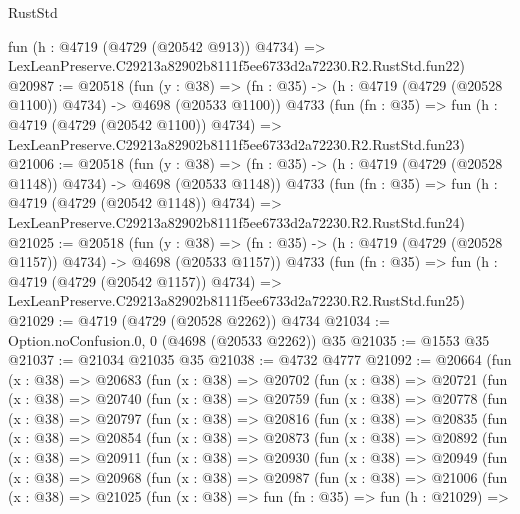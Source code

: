 \begin{lexlean}{RustStd}
\begin{coremodule}
    fun (h : @4719 (@4729 (@20542 @913)) @4734) =>
    LexLeanPreserve.C29213a82902b8111f5ee6733d2a72230.R2.RustStd.fun22)
@20987 := @20518
    (fun (y : @38) =>
    (fn : @35) -> (h : @4719 (@4729 (@20528 @1100)) @4734) -> @4698 (@20533 @1100))
    @4733
    (fun (fn : @35) =>
    fun (h : @4719 (@4729 (@20542 @1100)) @4734) =>
    LexLeanPreserve.C29213a82902b8111f5ee6733d2a72230.R2.RustStd.fun23)
@21006 := @20518
    (fun (y : @38) =>
    (fn : @35) -> (h : @4719 (@4729 (@20528 @1148)) @4734) -> @4698 (@20533 @1148))
    @4733
    (fun (fn : @35) =>
    fun (h : @4719 (@4729 (@20542 @1148)) @4734) =>
    LexLeanPreserve.C29213a82902b8111f5ee6733d2a72230.R2.RustStd.fun24)
@21025 := @20518
    (fun (y : @38) =>
    (fn : @35) -> (h : @4719 (@4729 (@20528 @1157)) @4734) -> @4698 (@20533 @1157))
    @4733
    (fun (fn : @35) =>
    fun (h : @4719 (@4729 (@20542 @1157)) @4734) =>
    LexLeanPreserve.C29213a82902b8111f5ee6733d2a72230.R2.RustStd.fun25)
@21029 := @4719 (@4729 (@20528 @2262)) @4734
@21034 := Option.noConfusion.{0, 0} (@4698 (@20533 @2262)) @35
@21035 := @1553 @35
@21037 := @21034 @21035 @35
@21038 := @4732 @4777
@21092 := @20664
    (fun (x : @38) =>
    @20683
      (fun (x : @38) =>
      @20702
        (fun (x : @38) =>
        @20721
          (fun (x : @38) =>
          @20740
            (fun (x : @38) =>
            @20759
              (fun (x : @38) =>
              @20778
                (fun (x : @38) =>
                @20797
                  (fun (x : @38) =>
                  @20816
                    (fun (x : @38) =>
                    @20835
                      (fun (x : @38) =>
                      @20854
                        (fun (x : @38) =>
                        @20873
                          (fun (x : @38) =>
                          @20892
                            (fun (x : @38) =>
                            @20911
                              (fun (x : @38) =>
                              @20930
                                (fun (x : @38) =>
                                @20949
                                  (fun (x : @38) =>
                                  @20968
                                    (fun (x : @38) =>
                                    @20987
                                      (fun (x : @38) =>
                                      @21006
                                        (fun (x : @38) =>
                                        @21025
                                          (fun (x : @38) =>
                                          fun (fn : @35) =>
                                          fun (h : @21029) =>

\end{coremodule}
\end{lexlean}
